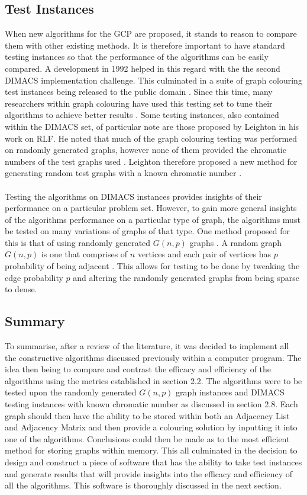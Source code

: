 \subsection{Test Instances}
When new algorithms for the GCP are proposed, it stands to reason to compare them with other existing methods. It is therefore important to have standard testing instances so that the performance of the algorithms can be easily compared. A development in 1992 helped in this regard with the the second DIMACS implementation challenge. This culminated in a suite of graph colouring test instances being released to the public domain \cite{DIMACSChallenge2}. Since this time, many researchers within graph colouring have used this testing set to tune their algorithms to achieve better results \cite{LewisR.M.R2015AGtG}. Some testing instances, also contained within the DIMACS set, of particular note are those proposed by Leighton in his work on RLF. He noted that much of the graph colouring testing was performed on randomly generated graphs, however none of them provided the chromatic numbers of the test graphs used \cite{Leighton1979AGC}. Leighton therefore proposed a new method for generating random test graphs with a known chromatic number \cite{Leighton1979AGC}. 
\\\\
Testing the algorithms on DIMACS instances provides insights of their performance on a particular problem set. However, to gain more general insights of the algorithms performance on a particular type of graph, the algorithms must be tested on many variations of graphs of that type. One method proposed for this is that of using randomly generated $G(n, p)$ graphs \cite{LewisR.M.R2015AGtG}. A random graph $G(n, p)$ is one that comprises of $n$ vertices and each pair of vertices has $p$ probability of being adjacent \cite{LewisR.M.R2015AGtG}. This allows for testing to be done by tweaking the edge probability $p$ and altering the randomly generated graphs from being sparse to dense. 


\subsection{Summary}
To summarise, after a review of the literature, it was decided to implement all the constructive algorithms discussed previously within a computer program. The idea then being to compare and contrast the efficacy and efficiency of the algorithms using the metrics established in section 2.2. The algorithms were to be tested upon the randomly generated $G(n, p)$ graph instances and DIMACS testing instances with known chromatic number as discussed in section 2.8. Each graph should then have the ability to be stored within both an Adjacency List and Adjacency Matrix and then provide a colouring solution by inputting it into one of the algorithms. Conclusions could then be made as to the most efficient method for storing graphs within memory. This all culminated in the decision to design and construct a piece of software that has the ability to take test instances and generate results that will provide insights into the efficacy and efficiency of all the algorithms. This software is thoroughly discussed in the next section. 